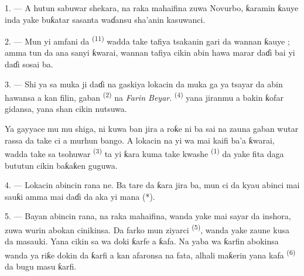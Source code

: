 
\VUsaut{4.0mm}
\VUsaut{3.0mm}
\VUfilet{16mm}
\VUsaut{5.6mm}
\VUsaut{3.0mm}

\VUsaut{3.0mm}

\VUsaut{4.0mm}

1. --- A hutun sabuwar shekara, na raka mahaifina zuwa Novurbo,
ƙaramin ƙauye inda yake buƙatar sasanta waɗansu sha’anin kasuwanci.

2. --- Mun yi amfani da  \textsuperscript{(11)}
wadda take tafiya tsakanin gari da wannan ƙauye ; amma tun da ana sanyi
ƙwarai, wannan tafiya cikin abin hawa marar daɗi bai yi daɗi sosai ba.

3. --- Shi ya sa muka ji daɗi na gaskiya lokacin da muka ga  ya tsayar da abin hawansa a kan filin, gaban 
\textsuperscript{(2)} na \textit{Farin Beyar}. 
\textsuperscript{(4)} yana jiranmu a bakin ƙofar gidansa, yana shan
 cikin nutsuwa.

Ya gayyace mu mu shiga, ni kuwa ban jira a roƙe ni ba sai na zauna
gaban wutar rassa da take ci a murhun bango. A lokacin na yi wa
 mai kaifi ba’a ƙwarai, wadda take sa tsohuwar
 \textsuperscript{(3)} ta yi ƙara kuma take kwashe
 \textsuperscript{(1)} da yake fita daga bututun cikin
baƙaƙen guguwa.

4. --- Lokacin abincin rana ne. Ba tare da ƙara jira ba, mun ci da
kyau abinci mai sauƙi amma mai daɗi da aka yi mana (*).

\VUsaut{3.0mm}

5. --- Bayan abincin rana, na raka mahaifina, wanda yake mai sayar da
inshora, zuwa wurin abokan cinikinsa. Da farko mun ziyarci
 \textsuperscript{(5)}, wanda yake zaune kusa da masauki.
Yana cikin sa wa doki ƙarfe a ƙafa. Na yaba wa ƙarfin abokinsa wanda
ya riƙe  dokin da ƙarfi a kan afaronsa na fata, alhali
maƙerin yana kafa  \textsuperscript{(6)} da
bugu masu ƙarfi.

